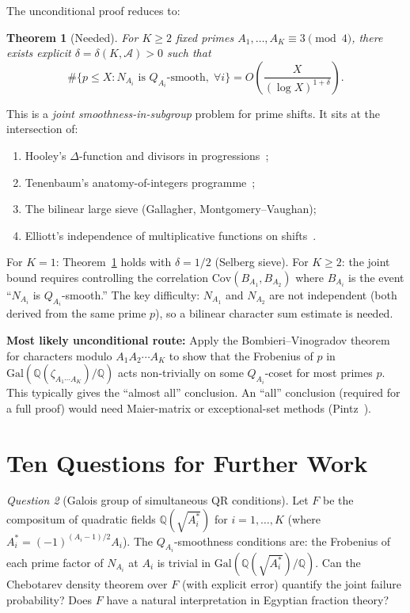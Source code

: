 \documentclass[12pt]{amsart}
\newtheorem{theorem}{Theorem}[section]
\theoremstyle{definition}
\theoremstyle{remark}
\newtheorem{question}[theorem]{Question}
\begin{document}
The unconditional proof reduces to:

\begin{theorem}[Needed]\label{thm:needed}
For $K \ge 2$ fixed primes $A_1, \ldots, A_K \equiv 3 \pmod{4}$,
there exists explicit $\delta = \delta(K, \mathcal{A}) > 0$ such that
\[
  \#\bigl\{p \le X : N_{A_i} \text{ is } Q_{A_i}\text{-smooth},\;\forall i\bigr\}
  = O\!\left(\frac{X}{(\log X)^{1+\delta}}\right).
\]
\end{theorem}

This is a \emph{joint smoothness-in-subgroup} problem for prime shifts.
It sits at the intersection of:
\begin{enumerate}
  \item Hooley's $\Delta$-function and divisors in progressions~\cite{Hooley1979};
  \item Tenenbaum's anatomy-of-integers programme~\cite{Tenenbaum1984};
  \item The bilinear large sieve (Gallagher, Montgomery--Vaughan);
  \item Elliott's independence of multiplicative functions on shifts~\cite{Elliott1980}.
\end{enumerate}

For $K = 1$: Theorem~\ref{thm:needed} holds with $\delta = 1/2$ (Selberg sieve).
For $K \ge 2$: the joint bound requires controlling the correlation
$\text{Cov}(B_{A_1}, B_{A_2})$ where $B_{A_i}$ is the event
``$N_{A_i}$ is $Q_{A_i}$-smooth.''
The key difficulty: $N_{A_1}$ and $N_{A_2}$ are not independent
(both derived from the same prime $p$),
so a bilinear character sum estimate is needed.

\textbf{Most likely unconditional route:}
Apply the Bombieri--Vinogradov theorem for characters modulo $A_1 A_2 \cdots A_K$
to show that the Frobenius of $p$ in $\mathrm{Gal}(\mathbb{Q}(\zeta_{A_1 \cdots A_K})/\mathbb{Q})$
acts non-trivially on some $Q_{A_i}$-coset for most primes $p$.
This typically gives the ``almost all'' conclusion.
An ``all'' conclusion (required for a full proof) would need Maier-matrix or
exceptional-set methods (Pintz~\cite{Pintz1997}).

\section{Ten Questions for Further Work}\label{sec:questions}

\begin{question}[Galois group of simultaneous QR conditions]\label{q:galois}
Let $F$ be the compositum of quadratic fields
$\mathbb{Q}(\sqrt{A_i^*})$ for $i = 1, \ldots, K$
(where $A_i^* = (-1)^{(A_i-1)/2} A_i$).
The $Q_{A_i}$-smoothness conditions are: the Frobenius of each prime factor of
$N_{A_i}$ at $A_i$ is trivial in $\mathrm{Gal}(\mathbb{Q}(\sqrt{A_i^*})/\mathbb{Q})$.
Can the Chebotarev density theorem over $F$ (with explicit error)
quantify the joint failure probability?
Does $F$ have a natural interpretation in Egyptian fraction theory?
\end{question}
\end{document}
